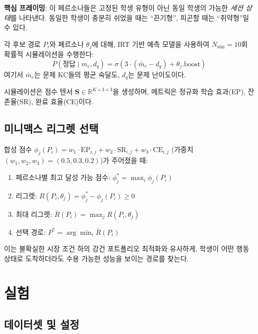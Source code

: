 \documentclass[runningheads]{llncs}
\begin{document}
\textbf{핵심 프레이밍}: 이 페르소나들은 고정된 학생 유형이 아닌 동일 학생의 가능한 \emph{세션 상태}를 나타낸다.
동일한 학생이 충분히 쉬었을 때는 ``끈기형'', 피곤할 때는 ``취약형''일 수 있다.

각 후보 경로 $P_i$와 페르소나 $\theta_j$에 대해, IRT 기반 예측 모델을 사용하여 $N_{\text{sim}}=10$회 확률적 시뮬레이션을 수행한다:
\begin{equation}
P(\text{정답} \mid m_c, d_q) = \sigma(3 \cdot (\bar{m}_c - d_q) + \theta_j.\text{boost})
\end{equation}
여기서 $\bar{m}_c$는 문제 KC들의 평균 숙달도, $d_q$는 문제 난이도이다.

시뮬레이션은 점수 텐서 $\mathbf{S} \in \mathbb{R}^{K \times 3 \times 3}$을 생성하며, 메트릭은 정규화 학습 효과(EP), 잔존율(SR), 완료 효율(CE)이다.

\subsection{미니맥스 리그렛 선택}

합성 점수 $\phi_j(P_i) = w_1 \cdot \text{EP}_{i,j} + w_2 \cdot \text{SR}_{i,j} + w_3 \cdot \text{CE}_{i,j}$ (가중치 $(w_1, w_2, w_3) = (0.5, 0.3, 0.2)$)가 주어졌을 때:

\begin{enumerate}
\item 페르소나별 최고 달성 가능 점수: $\phi_j^* = \max_i \phi_j(P_i)$
\item 리그렛: $R(P_i, \theta_j) = \phi_j^* - \phi_j(P_i) \geq 0$
\item 최대 리그렛: $\bar{R}(P_i) = \max_j R(P_i, \theta_j)$
\item 선택 경로: $P^* = \arg\min_i \bar{R}(P_i)$
\end{enumerate}

이는 불확실한 시장 조건 하의 강건 포트폴리오 최적화와 유사하게, 학생이 어떤 행동 상태로 도착하더라도 수용 가능한 성능을 보이는 경로를 찾는다.

\section{실험}

\subsection{데이터셋 및 설정}
\end{document}
